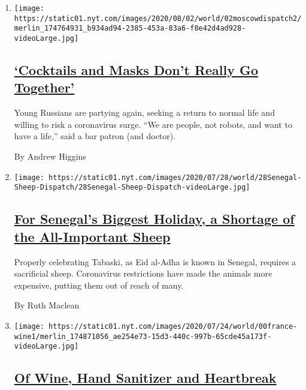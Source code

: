 \begin{enumerate}
\def\labelenumi{\arabic{enumi}.}
\item
  \texttt{[image: https://static01.nyt.com/images/2020/08/02/world/02moscowdispatch2/merlin\_174764931\_b934ad94-2385-453a-83a6-f8e42d4ad928-videoLarge.jpg]}

  \hypertarget{cocktails-and-masks-dont-really-go-together}{%
  \subsection{\texorpdfstring{\href{/2020/08/01/world/europe/russia-moscow-coronavirus.html}{`Cocktails
  and Masks Don't Really Go
  Together'}}{`Cocktails and Masks Don't Really Go Together'}}\label{cocktails-and-masks-dont-really-go-together}}

  Young Russians are partying again, seeking a return to normal life and
  willing to risk a coronavirus surge. ``We are people, not robots, and
  want to have a life,'' said a bar patron (and doctor).

  By Andrew Higgins
\item
  \texttt{[image: https://static01.nyt.com/images/2020/07/28/world/28Senegal-Sheep-Dispatch/28Senegal-Sheep-Dispatch-videoLarge.jpg]}

  \hypertarget{for-senegals-biggest-holiday-a-shortage-of-the-all-important-sheep}{%
  \subsection{\texorpdfstring{\href{/2020/07/29/world/africa/senegal-tabaski-sheep-eid-adha.html}{For
  Senegal's Biggest Holiday, a Shortage of the All-Important
  Sheep}}{For Senegal's Biggest Holiday, a Shortage of the All-Important Sheep}}\label{for-senegals-biggest-holiday-a-shortage-of-the-all-important-sheep}}

  Properly celebrating Tabaski, as Eid al-Adha is known in Senegal,
  requires a sacrificial sheep. Coronavirus restrictions have made the
  animals more expensive, putting them out of reach of many.

  By Ruth Maclean
\item
  \texttt{[image: https://static01.nyt.com/images/2020/07/24/world/00france-wine1/merlin\_174871056\_ae254e73-15d3-440c-997b-65cde45a173f-videoLarge.jpg]}

  \hypertarget{of-wine-hand-sanitizer-and-heartbreak}{%
  \subsection{\texorpdfstring{\href{/2020/07/27/world/europe/france-alsace-wine-coronavirus.html}{Of
  Wine, Hand Sanitizer and
  Heartbreak}}{Of Wine, Hand Sanitizer and Heartbreak}}\label{of-wine-hand-sanitizer-and-heartbreak}}


\end{enumerate}
